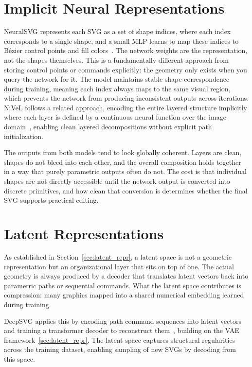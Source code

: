 \section{Implicit Neural Representations}

NeuralSVG represents each SVG as a set of shape indices, where 
each index corresponds to a single shape, and a small MLP learns 
to map these indices to B\'{e}zier control points and fill 
colors~\cite{polaczekNeuralSVGImplicitRepresentation2025}. The 
network weights are the representation, not the shapes themselves. 
This is a fundamentally different approach from storing control 
points or commands explicitly: the geometry only exists when you 
query the network for it. The model maintains stable shape 
correspondence during training, meaning each index always maps to 
the same visual region, which prevents the network from producing 
inconsistent outputs across iterations. NiVeL follows a related 
approach, encoding the entire layered structure implicitly where 
each layer is defined by a continuous neural function over the 
image 
domain~\cite{thamizharasanNIVeLNeuralImplicit2024}, enabling 
clean layered decompositions without explicit path initialization.

The outputs from both models tend to look globally coherent. 
Layers are clean, shapes do not bleed into each other, and the 
overall composition holds together in a way that purely parametric 
outputs often do not. The cost is that individual shapes are not 
directly accessible until the network output is converted into 
discrete primitives, and how clean that conversion is determines 
whether the final SVG supports practical editing.

\section{Latent Representations}

As established in Section~\ref{sec:latent_repr}, a latent space 
is not a geometric representation but an organizational layer 
that sits on top of one. The actual geometry is always produced 
by a decoder that translates latent vectors back into parametric 
paths or sequential commands. What the latent space contributes 
is compression: many graphics mapped into a shared numerical 
embedding learned during training.

DeepSVG applies this by encoding path command sequences into latent 
vectors and training a transformer decoder to reconstruct 
them~\cite{carlierDeepSVGHierarchicalGenerative2020}, building on 
the VAE framework~\ref{sec:latent_repr}. The latent space captures 
structural regularities across the training dataset, enabling 
sampling of new SVGs by decoding from this space.

